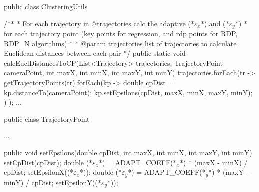 public class ClusteringUtils {
	
	/**
	* For each trajectory in @trajectories calc the adaptive (*$\varepsilon_x$*) and (*$\varepsilon_y$*)
	* for each trajectory point (key points for regression, and rdp points for RDP, RDP_N algorithms)
	*
	* @param trajectories    list of trajectories to calculate Euclidean distances between each pair
	*/
	public static void calcEuclDistancesToCP(List<Trajectory> trajectories, TrajectoryPoint cameraPoint, int maxX, int minX, int maxY, int minY) {
		trajectories.forEach(tr ->
			getTrajectoryPoints(tr).forEach(kp -> {
				double cpDist = kp.distanceTo(cameraPoint);
				kp.setEpsilons(cpDist, maxX, minX, maxY, minY);
			})
		);
	}
	...
}

public class TrajectoryPoint {
	...
	
	public void setEpsilons(double cpDist, int maxX, int minX, int maxY, int minY) {
		setCpDist(cpDist);
		double (*$\varepsilon_x$*) = ADAPT_COEFF(*$_x$*) * (maxX - minX) / cpDist;
		setEpsilonX((*$\varepsilon_x$*));
		double (*$\varepsilon_y$*) = ADAPT_COEFF(*$_y$*) * (maxY - minY) / cpDist;
		setEpsilonY((*$\varepsilon_y$*));
	}
	
}